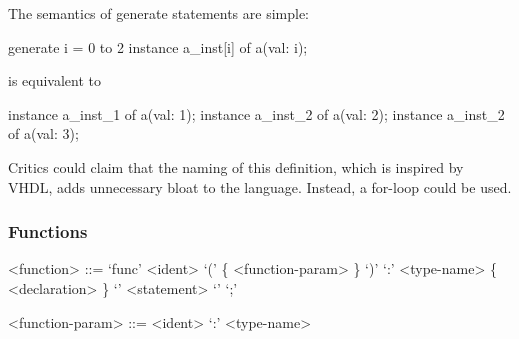 The semantics of {\ttfamily generate} statements are simple:
\begin{smeilcode}
generate i = 0 to 2 {
  instance a_inst[i] of a(val: i);
}
\end{smeilcode}
is equivalent to
\begin{smeilcode}
instance a_inst_1 of a(val: 1);
instance a_inst_2 of a(val: 2);
instance a_inst_2 of a(val: 3);
\end{smeilcode}
  
Critics could claim that the naming of this definition, which is inspired by
VHDL, adds unnecessary bloat to the language. Instead, a {\ttfamily for}-loop
could be used.  

\subsubsection{Functions}
\begin{grammar}
  <function> ::= `func' <ident> `(' \{ <function-param> \} `)' `:' <type-name>
  \{ <declaration> \} `{' { <statement> } `}' `;'

  <function-param> ::= <ident> `:' <type-name>
\end{grammar}




